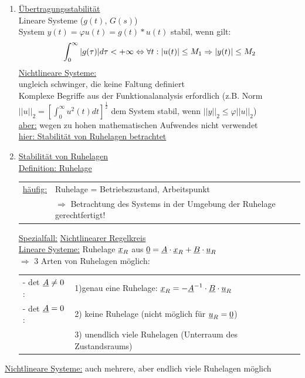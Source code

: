 \documentclass[openany,a4paper,11pt]{book}
\begin{document}
\begin{enumerate}
    \item \uline{Übertragungsstabilität}\\
    Lineare Systeme ($g(t)$, $G(s)$)\\
    System $y(t)=\varphi u(t)=g(t)*u(t)$ stabil, wenn gilt:
   \[\int_{0}^{\infty} |g(\tau)|d\tau < +\infty \Leftrightarrow \forall t: |u(t)|\le M_1 \\ \Rightarrow |y(t)|\le M_2 \]
    \uline{Nichtlineare Systeme:}\\
    ungleich schwinger, die keine Faltung definiert\\
    Komplexe Begriffe aus der Funktionalanalysis erfordlich (z.B. Norm $||u||_2=[\int_{0}^{\infty}u^2(t)dt]^{\frac{1}{2}}$ dem System stabil, wenn $||y||_2\le \varphi||u||_2$)\\
    \uline{aber:} wegen zu hohen mathematischen Aufwendes nicht verwendet\\
    \uline{hier: Stabilität von Ruhelagen betrachtet}
    \item \uline{Stabilität von Ruhelagen}\\
    \uline{Definition: Ruhelage}  \\
    \begin{tabular}{ll}
    \uline{häufig:} & Ruhelage = Betriebszustand, Arbeitspunkt\\
    & $\Rightarrow$ Betrachtung des Systems in der Umgebung der Ruhelage gerechtfertigt!\\
    \end{tabular}
    \uline{Spezialfall:} \uline{Nichtlinearer Regelkreis}  \\
    \uline{Lineare Systeme:} Ruhelage $\uline{x}_R$ aus $\uline{0}=\uline{A}\cdot\uline{x}_R+\uline{B}\cdot\uline{u}_R$\\
    $\Rightarrow$ 3 Arten von Ruhelagen möglich: \\
    \begin{tabular}{ll}
    - det $\uline{A} \ne 0$:& 1)genau eine Ruhelage: $\uline{x}_R=-\uline{A}^{-1}\cdot\uline{B}\cdot\uline{u}_R$\\
    - det $\uline{A} = 0$:& 2) keine Ruhelage (nicht möglich für $\uline{u}_R=\uline{0}$)\\
    & 3) unendlich viele Ruhelagen (Unterraum des Zustandsraums)\\
    \end{tabular}
\end{enumerate}
\uline{Nichtlineare Systeme:} auch mehrere, aber endlich viele Ruhelagen möglich\\
\end{document}
